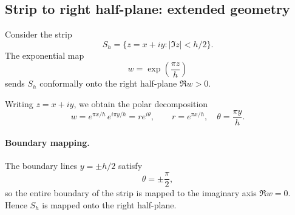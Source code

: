 \documentclass[12pt,a4paper]{article}
\begin{document}
	
	\subsection*{Strip to right half-plane: extended geometry}
	
	Consider the strip
	\[
	S_h = \{ z = x + iy : |\Im z| < h/2 \}.
	\]
	The exponential map
	\[
	w = \exp\!\left(\frac{\pi z}{h}\right)
	\]
	sends $S_h$ conformally onto the right half-plane $\Re w>0$.
	
	Writing $z=x+iy$, we obtain the polar decomposition
	\[
	w = e^{\pi x/h}\, e^{i\pi y/h}
	= r e^{i\theta},
	\qquad
	r = e^{\pi x/h},\quad
	\theta = \frac{\pi y}{h}.
	\]
	
	\paragraph{Boundary mapping.}
	The boundary lines $y=\pm h/2$ satisfy
	\[
	\theta = \pm \frac{\pi}{2},
	\]
	so the entire boundary of the strip is mapped to the imaginary axis
	$\Re w = 0$. Hence $S_h$ is mapped onto the right half-plane.
	
\end{document}
